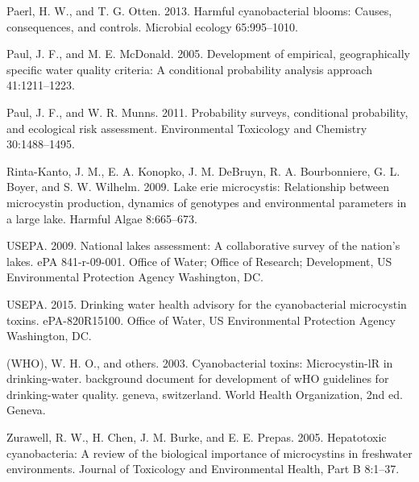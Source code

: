\documentclass[11pt,]{article}
\begin{document}
Paerl, H. W., and T. G. Otten. 2013. Harmful cyanobacterial blooms:
Causes, consequences, and controls. Microbial ecology 65:995--1010.

Paul, J. F., and M. E. McDonald. 2005. Development of empirical,
geographically specific water quality criteria: A conditional
probability analysis approach 41:1211--1223.

Paul, J. F., and W. R. Munns. 2011. Probability surveys, conditional
probability, and ecological risk assessment. Environmental Toxicology
and Chemistry 30:1488--1495.

Rinta-Kanto, J. M., E. A. Konopko, J. M. DeBruyn, R. A. Bourbonniere, G.
L. Boyer, and S. W. Wilhelm. 2009. Lake erie microcystis: Relationship
between microcystin production, dynamics of genotypes and environmental
parameters in a large lake. Harmful Algae 8:665--673.

USEPA. 2009. National lakes assessment: A collaborative survey of the
nation's lakes. ePA 841-r-09-001. Office of Water; Office of Research;
Development, US Environmental Protection Agency Washington, DC.

USEPA. 2015. Drinking water health advisory for the cyanobacterial
microcystin toxins. ePA-820R15100. Office of Water, US Environmental
Protection Agency Washington, DC.

(WHO), W. H. O., and others. 2003. Cyanobacterial toxins: Microcystin-lR
in drinking-water. background document for development of wHO guidelines
for drinking-water quality. geneva, switzerland. World Health
Organization, 2nd ed. Geneva.

Zurawell, R. W., H. Chen, J. M. Burke, and E. E. Prepas. 2005.
Hepatotoxic cyanobacteria: A review of the biological importance of
microcystins in freshwater environments. Journal of Toxicology and
Environmental Health, Part B 8:1--37.
\end{document}
